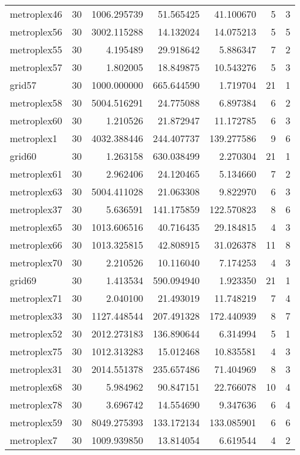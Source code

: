 \documentclass[../../../thesis.tex]{subfiles}
\begin{document}
\begin{longtable}{|l|r|r|r|r|r|r|}
metroplex46 & 30 & 1006.295739 & 51.565425 & 41.100670 & 5 & 3 \\
metroplex56 & 30 & 3002.115288 & 14.132024 & 14.075213 & 5 & 5 \\
metroplex55 & 30 & 4.195489 & 29.918642 & 5.886347 & 7 & 2 \\
metroplex57 & 30 & 1.802005 & 18.849875 & 10.543276 & 5 & 3 \\
grid57 & 30 & 1000.000000 & 665.644590 & 1.719704 & 21 & 1 \\
metroplex58 & 30 & 5004.516291 & 24.775088 & 6.897384 & 6 & 2 \\
metroplex60 & 30 & 1.210526 & 21.872947 & 11.172785 & 6 & 3 \\
metroplex1 & 30 & 4032.388446 & 244.407737 & 139.277586 & 9 & 6 \\
grid60 & 30 & 1.263158 & 630.038499 & 2.270304 & 21 & 1 \\
metroplex61 & 30 & 2.962406 & 24.120465 & 5.134660 & 7 & 2 \\
metroplex63 & 30 & 5004.411028 & 21.063308 & 9.822970 & 6 & 3 \\
metroplex37 & 30 & 5.636591 & 141.175859 & 122.570823 & 8 & 6 \\
metroplex65 & 30 & 1013.606516 & 40.716435 & 29.184815 & 4 & 3 \\
metroplex66 & 30 & 1013.325815 & 42.808915 & 31.026378 & 11 & 8 \\
metroplex70 & 30 & 2.210526 & 10.116040 & 7.174253 & 4 & 3 \\
grid69 & 30 & 1.413534 & 590.094940 & 1.923350 & 21 & 1 \\
metroplex71 & 30 & 2.040100 & 21.493019 & 11.748219 & 7 & 4 \\
metroplex33 & 30 & 1127.448544 & 207.491328 & 172.440939 & 8 & 7 \\
metroplex52 & 30 & 2012.273183 & 136.890644 & 6.314994 & 5 & 1 \\
metroplex75 & 30 & 1012.313283 & 15.012468 & 10.835581 & 4 & 3 \\
metroplex31 & 30 & 2014.551378 & 235.657486 & 71.404969 & 8 & 3 \\
metroplex68 & 30 & 5.984962 & 90.847151 & 22.766078 & 10 & 4 \\
metroplex78 & 30 & 3.696742 & 14.554690 & 9.347636 & 6 & 4 \\
metroplex59 & 30 & 8049.275393 & 133.172134 & 133.085901 & 6 & 6 \\
metroplex7 & 30 & 1009.939850 & 13.814054 & 6.619544 & 4 & 2 \\

\end{longtable}
\end{document}
